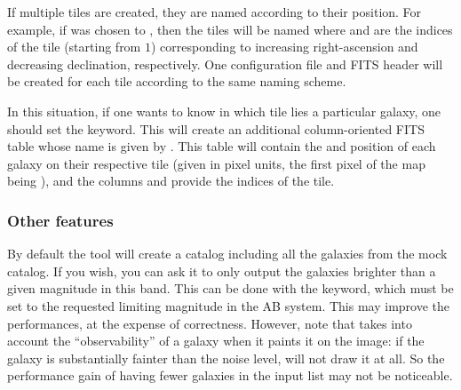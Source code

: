 If multiple tiles are created, they are named according to their position. For example, if  was chosen to , then the tiles will be named  where  and  are the indices of the tile (starting from $1$) corresponding to increasing right-ascension and decreasing declination, respectively. One \skymaker configuration file and FITS header will be created for each tile according to the same naming scheme.

In this situation, if one wants to know in which tile lies a particular galaxy, one should set the  keyword. This will create an additional column-oriented FITS table whose name is given by . This table will contain the  and  position of each galaxy on their respective tile (given in pixel units, the first pixel of the map being ), and the columns  and  provide the indices of the tile.

\subsubsection{Other features}

By default the tool will create a \skymaker catalog including all the galaxies from the mock catalog. If you wish, you can ask it to only output the galaxies brighter than a given magnitude in this band. This can be done with the  keyword, which must be set to the requested limiting magnitude in the AB system. This may improve the performances, at the expense of correctness. However, note that \skymaker takes into account the ``observability'' of a galaxy when it paints it on the image: if the galaxy is substantially fainter than the noise level, \skymaker will not draw it at all. So the performance gain of having fewer galaxies in the input list may not be noticeable.
